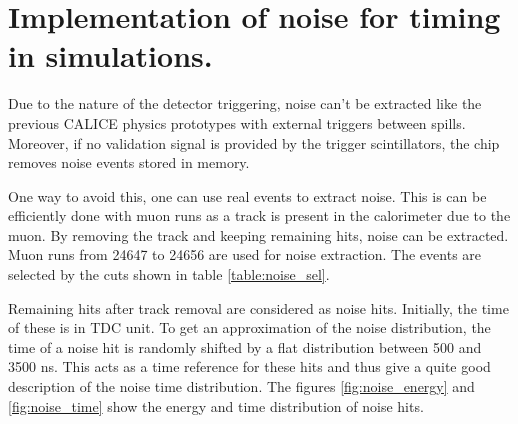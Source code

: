 \chapter{Implementation of noise for timing in simulations.}
\label{appendix:noise}

Due to the nature of the detector triggering, noise can't be extracted like the previous CALICE physics prototypes with external triggers between spills. Moreover, if no validation signal is provided by the trigger scintillators, the chip removes noise events stored in memory.

One way to avoid this, one can use real events to extract noise. This is can be efficiently done with muon runs as a track is present in the calorimeter due to the muon. By removing the track and keeping remaining hits, noise can be extracted. Muon runs from 24647 to 24656 are used for noise extraction. The events are selected by the cuts shown in table \ref{table:noise_sel}.

\begin{table}[htb!]
	\centering
	\caption{Selection cuts for noise extraction from muon runs.}
	\label{table:noise_sel}
\end{table}

Remaining hits after track removal are considered as noise hits. Initially, the time of these is in TDC unit. To get an approximation of the noise distribution, the time of a noise hit is randomly shifted by a flat distribution between 500 and 3500 ns. This acts as a time reference for these hits and thus give a quite good description of the noise time distribution. The figures \ref{fig:noise_energy} and \ref{fig:noise_time} show the energy and time distribution of noise hits.

